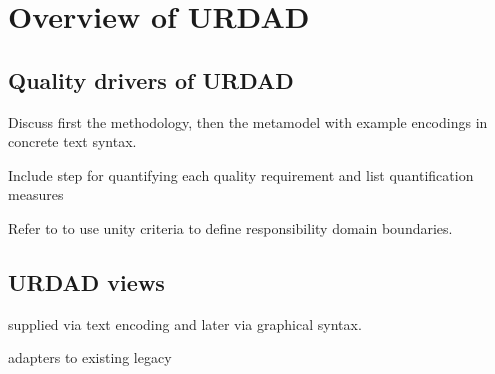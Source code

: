 \section{Overview of URDAD}

\subsection{Quality drivers of URDAD}

Discuss first the methodology, then the metamodel with example encodings in concrete text syntax.

Include step for quantifying each quality requirement and list quantification measures

Refer to \cite{gonzalez_unity_2009} to use unity criteria to define responsibility domain boundaries.

\subsection{URDAD views}

supplied via text encoding and later via graphical syntax.


adapters to existing legacy
